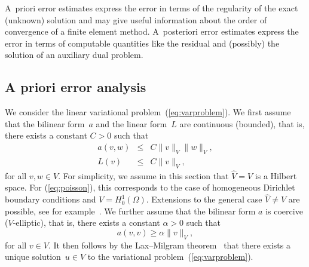A~priori error estimates express the error in terms of the regularity
of the exact (unknown) solution and may give useful information about
the order of convergence of a finite element method. A~posteriori
error estimates express the error in terms of computable quantities
like the residual and (possibly) the solution of an auxiliary dual
problem.

\subsection{A priori error analysis}

We consider the linear variational problem~(\ref{eq:varproblem}). We
first assume that the bilinear form~$a$ and the linear form~$L$ are
continuous (bounded), that is, there exists a constant $C > 0$ such
that
\begin{eqnarray} \label{eq:continuity}
  a(v, w) &\leq& C \|v\|_V \|w\|_V, \\
  L(v) &\leq& C \|v\|_V,
\end{eqnarray}
for all $v, w \in V$. For simplicity, we assume in this section that
$\hat{V} = V$ is a Hilbert space. For (\ref{eq:poisson}), this
corresponds to the case of homogeneous Dirichlet boundary conditions
and $V = H^1_0(\Omega)$. Extensions to the general case $\hat{V} \neq
V$ are possible, see for example~\cite{OdenDemkowicz1996}. We further
assume that the bilinear form $a$ is coercive ($V$-elliptic), that is,
there exists a constant $\alpha > 0$ such that
\begin{equation} \label{eq:coercivity}
  a(v, v) \geq \alpha \|v\|_V,
\end{equation}
for all $v \in V$. It then follows by the Lax--Milgram
theorem~\cite{LaxMilgram1954} that there exists a unique solution~$u
\in V$ to the variational problem~(\ref{eq:varproblem}).

